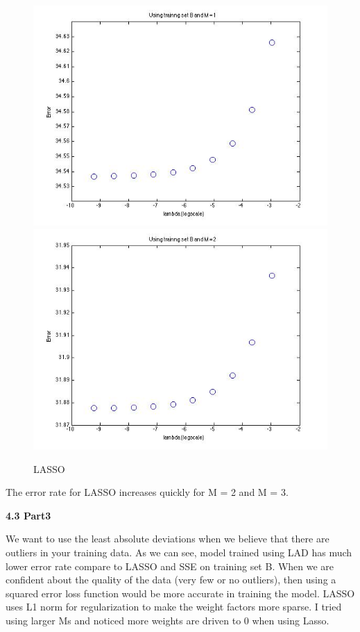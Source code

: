 \begin{figure}[!htb]
\endminipage\hfill
{}                                                                                 \includegraphics[width=\linewidth]{figures/p4_LASSO_regressB_m=1}
\endminipage\hfill
{}
  \includegraphics[width=\linewidth]{figures/p4_LASSO_regressB_m=2}
\endminipage\hfill
\caption{LASSO}
\end{figure}


The error rate for LASSO increases quickly for M = 2 and M = 3.

{\bfseries 4.3 Part3}

We want to use the least absolute deviations
when we believe that there are outliers in your training data. As we can see, model trained using LAD
has much lower error rate compare to LASSO and SSE on training set B. When we are confident about the quality of the data (very few or no outliers), then using a squared error loss function would be more accurate in training the model. LASSO uses L1 norm for regularization to make the weight factors more sparse. 
I tried using larger Ms and noticed more weights are driven to 0 when using Lasso. 
